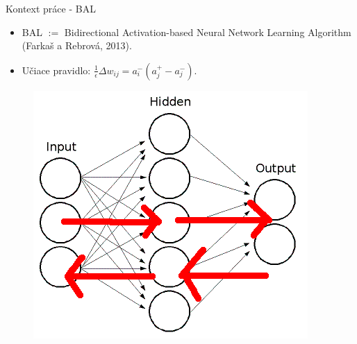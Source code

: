 \documentclass[xcolor=dvipsnames]{beamer}
\begin{document}
\newcommand{\Bx}{{\bf x}}
\newcommand{\By}{{\bf y}}
\newcommand{\Bh}{{\bf h}}
\newcommand{\Bw}{{\bf w}}
\newcommand{\Bc}{{\bf c}}

\begin{frame}{Kontext práce - BAL}
  \begin{itemize}
    \item BAL $:=$ Bidirectional Activation-based Neural Network Learning Algorithm (Farkaš a Rebrová, 2013).
    \item Učiace pravidlo: $ \frac{1}{\epsilon}\Delta w_{ij} = a_{i}^{-}(a_{j}^{+} - a_{j}^{-}). $
  \end{itemize}
  
  \vspace{-0.3cm}
  
  \begin{figure}[h!]  
    \centering
    \vspace{-5pt} 
    \includegraphics[scale=0.4]{img/3_layer_network_bal.png}
  \end{figure} 
  
  \vspace{-0.6cm}
  

\end{frame}
\end{document}
